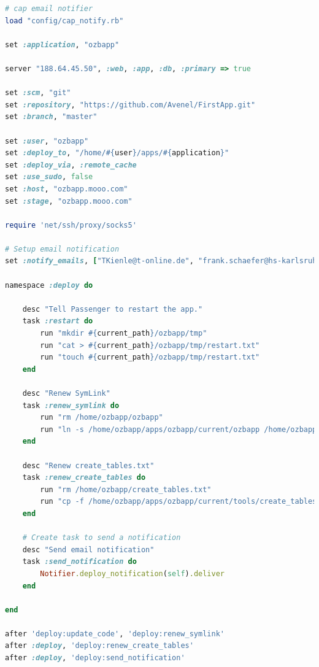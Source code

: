 \documentclass[12pt,             %
               a4paper,          %
               listof=totoc,     %
               index=totoc,      %
               bibliography=totoc,%
               oneside,         %
               BCOR1cm,          %
               english   %
               ]{scrbook}
\begin{document}
\clearpage
\begin{lstlisting}[language=Ruby, frame=single, caption=deploy.rb, tabsize=2, flexiblecolumns=true, captionpos=b]
# cap email notifier
load "config/cap_notify.rb"

set :application, "ozbapp"

server "188.64.45.50", :web, :app, :db, :primary => true

set :scm, "git"
set :repository, "https://github.com/Avenel/FirstApp.git"
set :branch, "master"

set :user, "ozbapp"
set :deploy_to, "/home/#{user}/apps/#{application}"
set :deploy_via, :remote_cache
set :use_sudo, false
set :host, "ozbapp.mooo.com"
set :stage, "ozbapp.mooo.com"

require 'net/ssh/proxy/socks5'

# Setup email notification
set :notify_emails, ["TKienle@t-online.de", "frank.schaefer@hs-karlsruhe.de", "stefan.welte@stud.uni-karlsruhe.de"]

namespace :deploy do

	desc "Tell Passenger to restart the app."
	task :restart do
		run "mkdir #{current_path}/ozbapp/tmp"
		run "cat > #{current_path}/ozbapp/tmp/restart.txt"
		run "touch #{current_path}/ozbapp/tmp/restart.txt"
	end

	desc "Renew SymLink"
	task :renew_symlink do
		run "rm /home/ozbapp/ozbapp"
		run "ln -s /home/ozbapp/apps/ozbapp/current/ozbapp /home/ozbapp/ozbapp"
	end

	desc "Renew create_tables.txt"
	task :renew_create_tables do
		run "rm /home/ozbapp/create_tables.txt"
		run "cp -f /home/ozbapp/apps/ozbapp/current/tools/create_tables.txt /home/ozbapp/create_tables.txt"
	end

	# Create task to send a notification
	desc "Send email notification"
	task :send_notification do
		Notifier.deploy_notification(self).deliver 
	end

end

after 'deploy:update_code', 'deploy:renew_symlink'
after :deploy, 'deploy:renew_create_tables'
after :deploy, 'deploy:send_notification'
\end{lstlisting}\label{listing:capify_deploy}

\newpage
\listoffigures

\newpage
\listoftables

\newpage
\lstlistoflistings

\newpage

\end{document}
